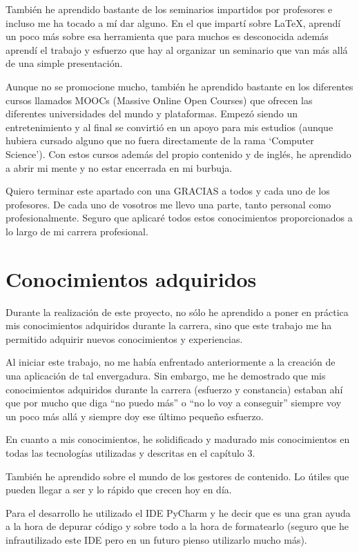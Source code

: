 También he aprendido bastante de los seminarios impartidos por profesores e incluso me ha tocado a mí dar alguno. En el que impartí sobre LaTeX, aprendí un poco más sobre esa herramienta que para muchos es desconocida además aprendí el trabajo y esfuerzo que hay al organizar un seminario que van más allá de una simple presentación.


Aunque no se promocione mucho, también he aprendido bastante en los diferentes cursos llamados MOOCs (Massive Online Open Courses) que ofrecen las diferentes universidades del mundo y plataformas. Empezó siendo un entretenimiento y al final se convirtió en un apoyo para mis estudios (aunque hubiera cursado alguno que no fuera directamente de la rama ‘Computer Science’). Con estos cursos además del propio contenido y de inglés, he aprendido a abrir mi mente y no estar encerrada en mi burbuja.


Quiero terminar este apartado con una GRACIAS a todos y cada uno de los profesores. De cada uno de vosotros me llevo una parte, tanto personal como profesionalmente. Seguro que aplicaré todos estos conocimientos proporcionados a lo largo de mi carrera profesional.



\section{Conocimientos adquiridos} 
\label{sec:adquiridos}

Durante la realización de este proyecto, no sólo he aprendido a poner en práctica mis conocimientos adquiridos durante la carrera, sino que este trabajo me ha permitido adquirir nuevos conocimientos y experiencias.


Al iniciar este trabajo, no me había enfrentado anteriormente a la creación de una aplicación de tal envergadura. Sin embargo, me he demostrado que mis conocimientos adquiridos durante la carrera (esfuerzo y constancia) estaban ahí que por mucho que diga “no puedo más” o “no lo voy a conseguir” siempre voy un poco más allá y siempre doy ese último pequeño esfuerzo.


En cuanto a mis conocimientos, he solidificado y madurado mis conocimientos en todas las tecnologías utilizadas y descritas en el capítulo 3.


También he aprendido sobre el mundo de los gestores de contenido. Lo útiles que pueden llegar a ser y lo rápido que crecen hoy en día.


Para el desarrollo he utilizado el IDE PyCharm y he decir que es una gran ayuda a la hora de depurar código y sobre todo a la hora de formatearlo (seguro que he infrautilizado este IDE pero en un futuro pienso utilizarlo mucho más).


